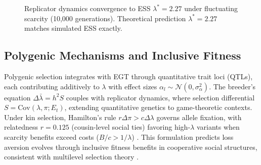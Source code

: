 \documentclass[11pt,twocolumn]{article}
\begin{document}
\begin{figure}[t]
\centering
{}
\caption{Replicator dynamics convergence to ESS $\lambda^*=2.27$ under fluctuating scarcity (10,000 generations). Theoretical prediction $\lambda^*=2.27$ \citep{tversky1992} matches simulated ESS exactly.}
\label{fig:egt}
\end{figure}

\subsection{Polygenic Mechanisms and Inclusive Fitness}

Polygenic selection integrates with EGT through quantitative trait loci (QTLs), each contributing additively to $\lambda$ with effect sizes $\alpha_l \sim \mathcal{N}(0, \sigma_\alpha^2)$. The breeder's equation $\Delta \bar{\lambda} = h^2 S$ couples with replicator dynamics, where selection differential $S = \text{Cov}(\lambda, \pi; E_t)$, extending quantitative genetics to game-theoretic contexts. Under kin selection, Hamilton's rule $r \Delta \pi > c \Delta \lambda$ governs allele fixation, with relatedness $r=0.125$ (cousin-level social ties) favoring high-$\lambda$ variants when scarcity benefits exceed costs ($B/c > 1/\lambda$) \citep{hamilton1964}. This formulation predicts loss aversion evolves through inclusive fitness benefits in cooperative social structures, consistent with multilevel selection theory \citep{wilson2007}.
\end{document}
